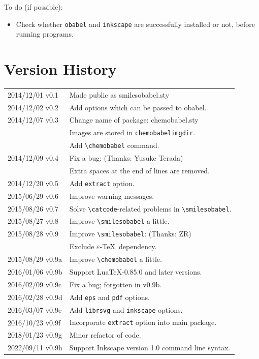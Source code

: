 \documentclass[dvipdfmx,12pt]{jsarticle}
\begin{document}
\clearpage

To do (if possible):
\begin{itemize}
\item Check whether \texttt{obabel} and \texttt{inkscape} are successfully
installed or not, before running programs.
\end{itemize}

\section{Version History}

\begin{table}[h]
\centering
\begin{tabular}{ll}
2014/12/01 v0.1  & Made public as \textsf{smilesobabel.sty} \\
2014/12/02 v0.2  & Add options which can be passed to obabel. \\
2014/12/07 v0.3  & Change name of package: \textsf{chemobabel.sty} \\
                 & Images are stored in \texttt{chemobabelimgdir}. \\
                 & Add \verb|\chemobabel| command. \\
2014/12/09 v0.4  & Fix a bug: (Thanks: Yusuke Terada) \\
                 & Extra spaces at the end of lines are removed. \\
2014/12/20 v0.5  & Add \verb|extract| option. \\
2015/06/29 v0.6  & Improve warning messages. \\
2015/08/26 v0.7  & Solve \verb|\catcode|-related problems in \verb|\smilesobabel|. \\
2015/08/27 v0.8  & Improve \verb|\smilesobabel| a little. \\
2015/08/28 v0.9  & Improve \verb|\smilesobabel|: (Thanks: ZR) \\
                 & Exclude $\varepsilon$-\TeX\ dependency. \\
2015/08/29 v0.9a & Improve \verb|\chemobabel| a little. \\
2016/01/06 v0.9b & Support Lua\TeX-0.85.0 and later versions. \\
2016/02/09 v0.9c & Fix a bug; forgotten in v0.9b. \\
2016/02/28 v0.9d & Add \verb|eps| and \verb|pdf| options. \\
2016/03/07 v0.9e & Add \verb|librsvg| and \verb|inkscape| options. \\
2016/10/23 v0.9f & Incorporate \verb|extract| option into main package. \\
2018/01/23 v0.9g & Minor refactor of code. \\
2022/09/11 v0.9h & Support Inkscape version 1.0 command line syntax. \\
\end{tabular}
\end{table}
\end{document}
